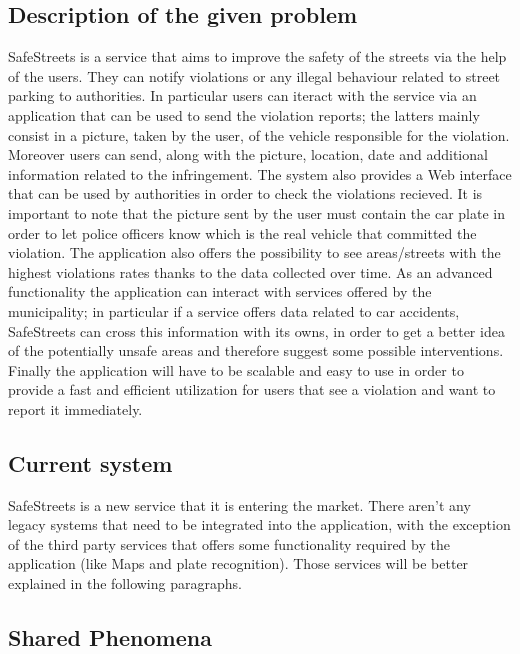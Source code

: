 \subsection{Description of the given problem}
SafeStreets is a service that aims to improve the safety of the streets via the help of the users. They can notify violations or any illegal behaviour related to street parking to authorities. In particular users can iteract with the service via an application that can be used to send the violation reports; the latters mainly consist in a picture, taken by the user, of the vehicle responsible for the violation. Moreover users can send, along with the picture, location, date and additional information related to the infringement. The system also provides a Web interface that can be used by authorities in order to check the violations recieved. It is important to note that the picture sent by the user must contain the car plate in order to let police officers know which is the real vehicle that committed the violation. The application also offers the possibility to see areas/streets with the highest violations rates thanks to the data collected over time. As an advanced functionality the application can interact with services offered by the municipality; in particular if a service offers data related to car accidents, SafeStreets can cross this information with its owns, in order to get a better idea of the potentially unsafe areas and therefore suggest some possible interventions. Finally the application will have to be scalable and easy to use in order to provide a fast and efficient utilization for users that see a violation and want to report it immediately.

\subsection{Current system}
SafeStreets is a new service that it is entering the market. There aren't any legacy systems that need to be integrated into the application, with the exception of the third party services that offers some functionality required by the application (like Maps and plate recognition). Those services will be better explained in the following paragraphs.


\subsection{Shared Phenomena}

